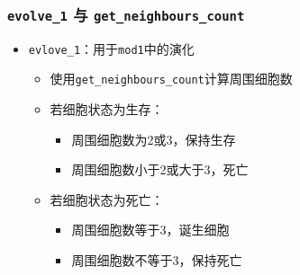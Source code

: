 \documentclass[11pt]{article}
\providecommand{\tightlist}{%
      \setlength{\itemsep}{0pt}\setlength{\parskip}{0pt}}
\begin{document}
    \hypertarget{evolve_1-ux4e0e-get_neighbours_count}{%
\subsubsection{\texorpdfstring{\texttt{evolve\_1} 与
\texttt{get\_neighbours\_count}}{evolve\_1 与 get\_neighbours\_count}}\label{evolve_1-ux4e0e-get_neighbours_count}}

\begin{itemize}
\tightlist
\item
  \texttt{evlove\_1}：用于\texttt{mod1}中的演化

  \begin{itemize}
  \tightlist
  \item
    使用\texttt{get\_neighbours\_count}计算周围细胞数
  \item
    若细胞状态为生存：

    \begin{itemize}
    \tightlist
    \item
      周围细胞数为2或3，保持生存
    \item
      周围细胞数小于2或大于3，死亡
    \end{itemize}
  \item
    若细胞状态为死亡：

    \begin{itemize}
    \tightlist
    \item
      周围细胞数等于3，诞生细胞
    \item
      周围细胞数不等于3，保持死亡
    \end{itemize}
  \end{itemize}
\end{itemize}
\end{document}
